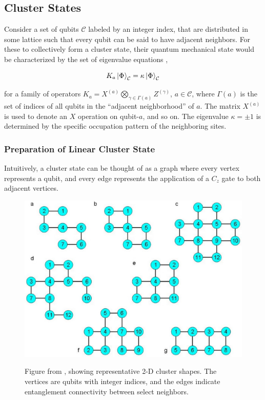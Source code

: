 \documentclass[twocolumn]{Styles/IEEEtran11}
\begin{document}
\subsection{Cluster States}
Consider a set of qubits $\mathcal{C}$ labeled by an integer index, that are distributed in some lattice such that every qubit can be said to have adjacent neighbors. For these to collectively form a cluster state, their quantum mechanical state would be characterized by the set of eigenvalue equations \cite{briegel2001persistent},

\begin{equation}
  K_a\left|\mspace{0.5mu} \Phi \mspace{0.5mu}\right\rangle_{\mathcal{C}}= \kappa\left|\mspace{0.5mu} \Phi \mspace{0.5mu}\right\rangle_{\mathcal{C}}
\end{equation}

\noindent for a family of operators $K_a = X^{(a)}\bigotimes_{\gamma\in\Gamma(a)}Z^{(\gamma)}$, $a\in\mathcal{C}$, where $\Gamma(a)$ is the set of indices of all qubits in the ``adjacent neighborhood'' of $a$. The matrix $X^{(a)}$ is used to denote an $X$ operation on qubit-$a$, and so on. The eigenvalue $\kappa = \pm 1$ is determined by the specific occupation pattern of the neighboring sites. 

\subsubsection{Preparation of Linear Cluster State}


Intuitively, a cluster state can be thought of as a graph
where every vertex represents a qubit, and every edge represents the
application of a $C_z$ gate to both adjacent vertices.

\begin{figure}[thb]
  \centering
  \includegraphics[width=0.9\linewidth]{Images/2d_clusters_rep.jpg}
  \label{I2dclustersfig}
  \caption{Figure from \protect\cite{gerald2006efficient}, showing representative 2-D cluster shapes. The vertices are qubits with integer indices, and the edges indicate entanglement connectivity between select neighbors.}
\end{figure}
\end{document}
